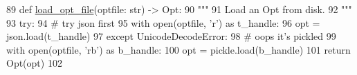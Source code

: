 \begin{DoxyCode}
89 \textcolor{keyword}{def }\hyperlink{namespaceparlai_1_1core_1_1opt_a37f4d5498e9174737b7dab37a786c04f}{load\_opt\_file}(optfile: str) -> Opt:
90     \textcolor{stringliteral}{"""}
91 \textcolor{stringliteral}{    Load an Opt from disk.}
92 \textcolor{stringliteral}{    """}
93     \textcolor{keywordflow}{try}:
94         \textcolor{comment}{# try json first}
95         with open(optfile, \textcolor{stringliteral}{'r') as t\_handle:}
96 \textcolor{stringliteral}{            opt = json.load(t\_handle)}
97 \textcolor{stringliteral}{    }\textcolor{keywordflow}{except} UnicodeDecodeError:
98         \textcolor{comment}{# oops it's pickled}
99         with open(optfile, \textcolor{stringliteral}{'rb'}) \textcolor{keyword}{as} b\_handle:
100             opt = pickle.load(b\_handle)
101     \textcolor{keywordflow}{return} Opt(opt)
102 \end{DoxyCode}
